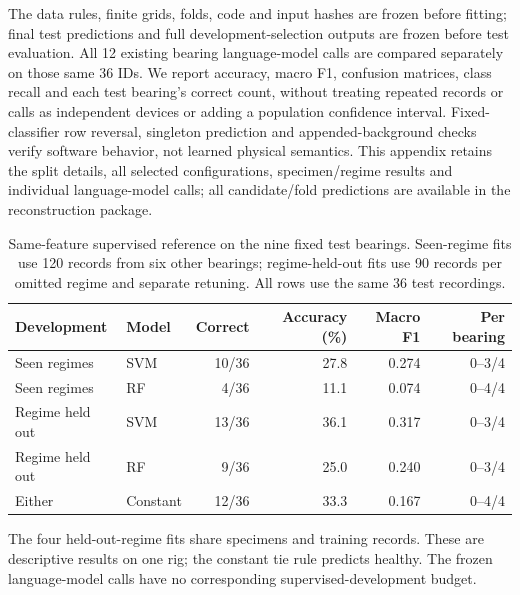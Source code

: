 \documentclass[11pt,a4paper]{article}
\begin{document}
The data rules, finite grids, folds, code and input hashes are frozen before fitting; final test predictions and full development-selection outputs are frozen before test evaluation. All 12 existing bearing language-model calls are compared separately on those same 36 IDs. We report accuracy, macro F1, confusion matrices, class recall and each test bearing's correct count, without treating repeated records or calls as independent devices or adding a population confidence interval. Fixed-classifier row reversal, singleton prediction and appended-background checks verify software behavior, not learned physical semantics. This appendix retains the split details, all selected configurations, specimen/regime results and individual language-model calls; all candidate/fold predictions are available in the reconstruction package.


\begin{table}[htbp]\centering\small
\caption{Same-feature supervised reference on the nine fixed test bearings. Seen-regime fits use 120 records from six other bearings; regime-held-out fits use 90 records per omitted regime and separate retuning. All rows use the same 36 test recordings.}
\label{tab:supp_bearing_baseline}
\begin{tabular}{@{}llrrrr@{}}\toprule
Development & Model & Correct & Accuracy (\%) & Macro F1 & Per bearing \\\midrule
Seen regimes & SVM & 10/36 & 27.8 & 0.274 & 0--3/4 \\
Seen regimes & RF & 4/36 & 11.1 & 0.074 & 0--4/4 \\
Regime held out & SVM & 13/36 & 36.1 & 0.317 & 0--3/4 \\
Regime held out & RF & 9/36 & 25.0 & 0.240 & 0--3/4 \\
Either & Constant & 12/36 & 33.3 & 0.167 & 0--4/4 \\
\bottomrule\end{tabular}
\par\smallskip\footnotesize The four held-out-regime fits share specimens and training records. These are descriptive results on one rig; the constant tie rule predicts healthy. The frozen language-model calls have no corresponding supervised-development budget.
\end{table}
\end{document}
